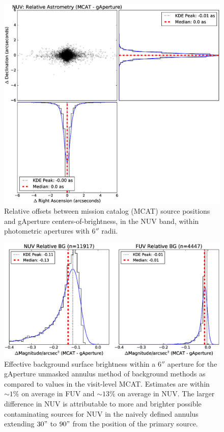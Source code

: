\documentclass[preprint]{aastex}
\begin{document}
\begin{figure}
\includegraphics[scale=0.65]{Fig03.eps}
\caption{Relative offsets between mission catalog (MCAT) source positions and gAperture centers-of-brightness, in the NUV band, within photometric apertures with $6''$ radii.
\label{nuvastrometry}}
\end{figure}


\begin{figure}
\includegraphics[scale=0.675]{Fig04.eps}
\caption{Effective background surface brightness within a $6''$ aperture for the gAperture unmasked annulus method of background methods as compared to values in the visit-level MCAT. Estimates are within $\sim 1\%$ on average in FUV and $\sim 13\%$ on average in NUV. The larger difference in NUV is attributable to more and brighter possible contaminating sources for NUV in the naively defined annulus extending $30"$ to $90"$ from the position of the primary source.
\label{bgrelphot}}
\end{figure}
\end{document}
